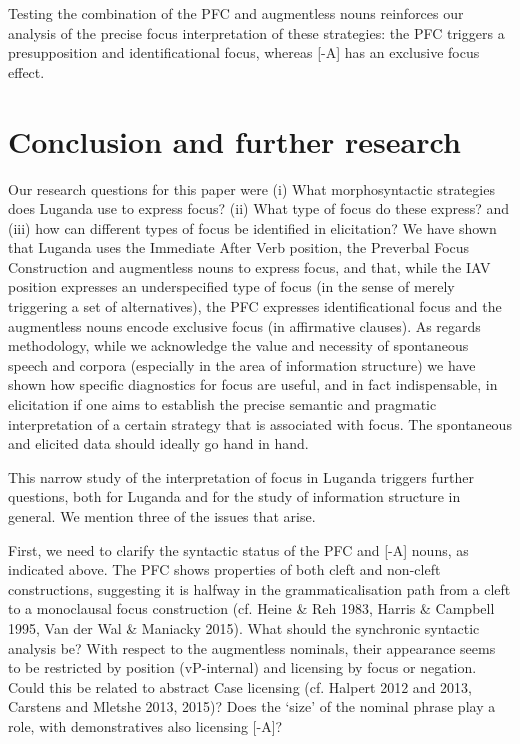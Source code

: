 \documentclass[output=paper]{langsci/langscibook}
\begin{document}
Testing the combination of the PFC and augmentless nouns reinforces our analysis of the precise focus interpretation of these strategies: the PFC triggers a presupposition and identificational focus, whereas [-A] has an exclusive focus effect.

\section{Conclusion and further research} 

Our research questions for this paper were (i) What morphosyntactic strategies does Luganda use to express focus? (ii) What type of focus do these express? and (iii) how can different types of focus be identified in elicitation? We have shown that Luganda uses the Immediate After Verb position, the Preverbal Focus Construction and augmentless nouns to express focus, and that, while the IAV position expresses an underspecified type of focus (in the sense of merely triggering a set of alternatives), the PFC expresses identificational focus and the augmentless nouns encode exclusive focus (in affirmative clauses). As regards methodology, while we acknowledge the value and necessity of spontaneous speech and corpora (especially in the area of information structure) we have shown how specific diagnostics for focus are useful, and in fact indispensable, in elicitation if one aims to establish the precise semantic and pragmatic interpretation of a certain strategy that is associated with focus. The spontaneous and elicited data should ideally go hand in hand.

This narrow study of the interpretation of focus in Luganda triggers further questions, both for Luganda and for the study of information structure in general. We mention three of the issues that arise.

First, we need to clarify the syntactic status of the PFC and [-A] nouns, as indicated above. The PFC shows properties of both cleft and non-cleft constructions, suggesting it is halfway in the grammaticalisation path from a cleft to a monoclausal focus construction (cf. Heine \& Reh 1983, Harris \& Campbell 1995, Van der Wal \& Maniacky 2015). What should the synchronic syntactic analysis be? With respect to the augmentless nominals, their appearance seems to be restricted by position (vP-internal) and licensing by focus or negation. Could this be related to abstract Case licensing (cf. Halpert 2012 and 2013, Carstens and Mletshe 2013, 2015)? Does the ‘size’ of the nominal phrase play a role, with demonstratives also licensing [-A]?
\end{document}
